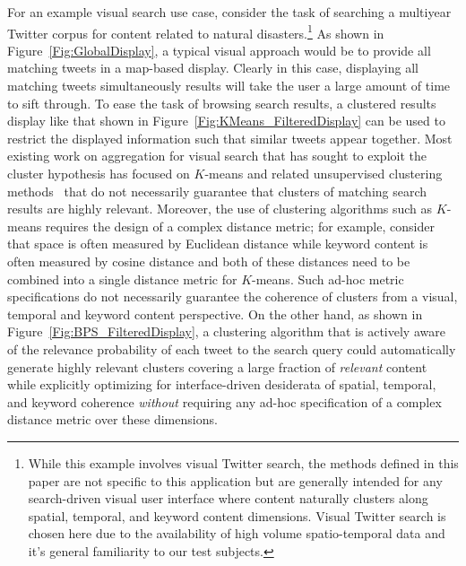 For an example visual search use case, consider the task of searching a multiyear Twitter corpus for content related to natural disasters.\footnote{While this example involves visual Twitter search, the methods defined in this paper are not specific to this application but are generally intended for any search-driven visual user interface where content naturally clusters along spatial, temporal, and keyword content dimensions.  Visual Twitter search is chosen here due to the availability of high volume spatio-temporal data and it's general familiarity to our test subjects.}
As shown in Figure~\ref{Fig:GlobalDisplay}, a typical visual approach would be to provide all matching tweets in a map-based display.
Clearly in this case, displaying all matching tweets simultaneously
results will take the user a large amount of time to sift through. 
To ease the task of browsing search results, a clustered results display like that shown in Figure~\ref{Fig:KMeans_FilteredDisplay} can be used to restrict the displayed information such that similar tweets appear together. 
Most existing work on aggregation for visual search that has sought to exploit the cluster hypothesis has focused on $K$-means and related unsupervised clustering methods~\cite{Ahlberg1995,Liu2014,Sankaranarayanan2009,Teitler2008,Bennamane2012,Shneiderman2013,Yifan2015,Smith2009} that do not necessarily guarantee that clusters of matching search results are highly relevant.  Moreover, the use of clustering algorithms such as $K$-means requires the design of a complex distance metric; for example, consider that space is often measured by Euclidean distance while keyword content is often measured by cosine distance and both of these distances need to be combined into a single distance metric for $K$-means.  Such ad-hoc metric specifications do not necessarily guarantee the coherence of clusters from a visual, temporal and keyword content perspective.
On the other hand, as shown in Figure~\ref{Fig:BPS_FilteredDisplay}, a clustering algorithm that is actively aware of the relevance probability of each tweet to the search query could automatically generate highly relevant clusters covering a large fraction of \emph{relevant} content while explicitly optimizing for interface-driven desiderata of spatial, temporal, and keyword coherence \emph{without} requiring any ad-hoc specification of a complex distance metric over these dimensions.
%

